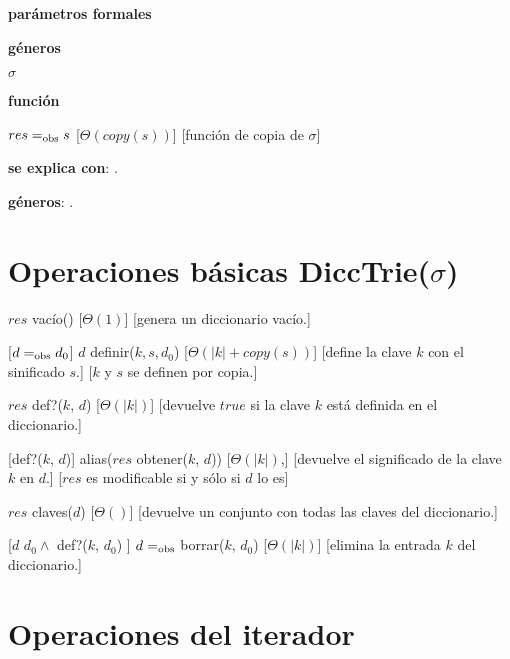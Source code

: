 \begin{Interfaz}
  \textbf{parámetros formales}\parindent\\
  \parbox{1.7cm}{\textbf{géneros}} $\sigma$\\
  \parbox[t]{1.7cm}{\textbf{función}}\parbox[t]{\textwidth-2\parindent-1.7cm}{    	
    {$res =_{\mathrm{obs}} s$}
    [$\Theta(copy(s))$]
    [función de copia de $\sigma$]
    }
      
  \textbf{se explica con}: .

  \textbf{géneros}: .

  \section*{Operaciones básicas DiccTrie($\sigma$)}

  {$res$ \igobs vacío()}
  [$\Theta(1)$]
  [genera un diccionario vacío.]

  [$d =_{\mathrm{obs}} d_0$]  
  {$d$ \igobs definir($k, s, d_0$)}
  [$\Theta(|k| + copy(s))$]
  [define la clave $k$ con el sinificado $s$.]
  [$k$ y $s$ se definen por copia.]
    
  {$res$ \igobs def?($k$, $d$) }
  [$\Theta(|k|)$]
  [devuelve $true$ si la clave $k$ está definida en el diccionario.]
  
  [def?($k$, $d$)]  
  {alias($res$ \igobs obtener($k$, $d$))}
  [$\Theta(|k|)$,]
  [devuelve el significado de la clave $k$ en $d$.]
  [$res$ es modificable si y sólo si $d$ lo es]
  
  {$res$ \igobs claves($d$)}
  [$\Theta()$]
  [devuelve un conjunto con todas las claves del diccionario.] 
  
  [$d$ \igobs $d_0 \land$ def?($k$, $d_0$) ]
  {$d =_{\mathrm{obs}}$ borrar($k$, $d_0$)}
  [$\Theta(|k|)$]
  [elimina la entrada $k$ del diccionario.] 
  
  \section*{Operaciones del iterador}


\end{Interfaz}
